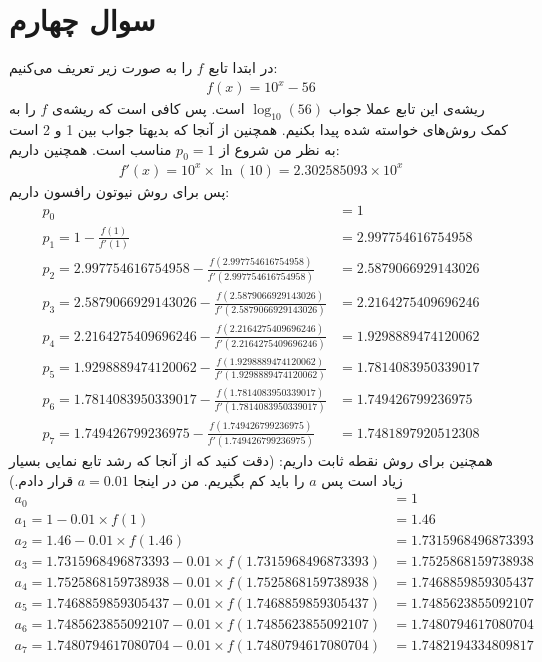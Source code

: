 \documentclass[]{article}
\begin{document}
\section*{سوال چهارم}
در ابتدا تابع $f$
را به صورت زیر تعریف می‌کنیم:
\begin{gather*}
    f(x) = 10^x - 56
\end{gather*}
ریشه‌ی این تابع عملا جواب
$\log_{10}(56)$
است. پس کافی است که ریشه‌ی
$f$
را به کمک روش‌های خواسته شده پیدا بکنیم. همچنین از آنجا که بدیهتا جواب بین 1 و 2 است به نظر من شروع از
$p_0 = 1$
مناسب است. همچنین داریم:
\begin{gather*}
    f'(x) = 10^x \times \ln(10) = 2.302585093 \times 10^x
\end{gather*}
پس برای روش نیوتون رافسون داریم:
\begin{align*}
    p_{0} &= 1\\
    p_{1} = 1 - \frac{f(1)}{f'(1)} &= 2.997754616754958\\
    p_{2} = 2.997754616754958 - \frac{f(2.997754616754958)}{f'(2.997754616754958)} &= 2.5879066929143026\\
    p_{3} = 2.5879066929143026 - \frac{f(2.5879066929143026)}{f'(2.5879066929143026)} &= 2.2164275409696246\\
    p_{4} = 2.2164275409696246 - \frac{f(2.2164275409696246)}{f'(2.2164275409696246)} &= 1.9298889474120062\\
    p_{5} = 1.9298889474120062 - \frac{f(1.9298889474120062)}{f'(1.9298889474120062)} &= 1.7814083950339017\\
    p_{6} = 1.7814083950339017 - \frac{f(1.7814083950339017)}{f'(1.7814083950339017)} &= 1.749426799236975\\
    p_{7} = 1.749426799236975 - \frac{f(1.749426799236975)}{f'(1.749426799236975)} &= \boxed{1.7481897920512308}
\end{align*}
همچنین برای روش نقطه ثابت داریم:
(دقت کنید که از آنجا که رشد تابع نمایی بسیار زیاد است پس $a$ را باید کم بگیریم. من در اینجا $a=0.01$ قرار دادم.)
\begin{align*}
    a_{0} &= 1\\
    a_{1} = 1 - 0.01 \times f(1) &= 1.46\\
    a_{2} = 1.46 - 0.01 \times f(1.46) &= 1.7315968496873393\\
    a_{3} = 1.7315968496873393 - 0.01 \times f(1.7315968496873393) &= 1.7525868159738938\\
    a_{4} = 1.7525868159738938 - 0.01 \times f(1.7525868159738938) &= 1.7468859859305437\\
    a_{5} = 1.7468859859305437 - 0.01 \times f(1.7468859859305437) &= 1.7485623855092107\\
    a_{6} = 1.7485623855092107 - 0.01 \times f(1.7485623855092107) &= 1.7480794617080704\\
    a_{7} = 1.7480794617080704 - 0.01 \times f(1.7480794617080704) &= \boxed{1.7482194334809817}
\end{align*}
\end{document}
